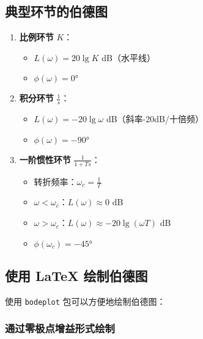 \documentclass[12pt,a4paper]{article}
\begin{document}
\subsection{典型环节的伯德图}
\begin{enumerate}
    \item \textbf{比例环节} $K$：
    \begin{itemize}
        \item $L(\omega) = 20\lg K$ dB（水平线）
        \item $\phi(\omega) = 0°$
    \end{itemize}
    
    \item \textbf{积分环节} $\frac{1}{s}$：
    \begin{itemize}
        \item $L(\omega) = -20\lg\omega$ dB（斜率-20dB/十倍频）
        \item $\phi(\omega) = -90°$
    \end{itemize}
    
    \item \textbf{一阶惯性环节} $\frac{1}{1+Ts}$：
    \begin{itemize}
        \item 转折频率：$\omega_c = \frac{1}{T}$
        \item $\omega < \omega_c$：$L(\omega) \approx 0$ dB
        \item $\omega > \omega_c$：$L(\omega) \approx -20\lg(\omega T)$ dB
        \item $\phi(\omega_c) = -45°$
    \end{itemize}
\end{enumerate}

\subsection{使用 LaTeX 绘制伯德图}
使用 \texttt{bodeplot} 包可以方便地绘制伯德图：

\subsubsection{通过零极点增益形式绘制}
\begin{center}
\end{center}
\end{document}
